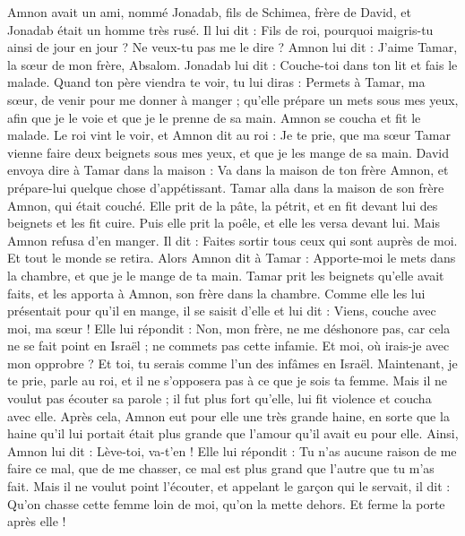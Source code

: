 \begin{multicols}{2}
Amnon avait un ami, nommé Jonadab, fils de Schimea, frère de David, et Jonadab était un homme très rusé.
Il lui dit : Fils de roi, pourquoi maigris-tu ainsi de jour en jour ? Ne veux-tu pas me le dire ? Amnon lui dit : J'aime Tamar, la sœur de mon frère, Absalom.
Jonadab lui dit : Couche-toi dans ton lit et fais le malade. Quand ton père viendra te voir, tu lui diras : Permets à Tamar, ma sœur, de venir pour me donner à manger ; qu'elle prépare un mets sous mes yeux, afin que je le voie et que je le prenne de sa main.
Amnon se coucha et fit le malade. Le roi vint le voir, et Amnon dit au roi : Je te prie, que ma sœur Tamar vienne faire deux beignets sous mes yeux, et que je les mange de sa main.
David envoya dire à Tamar dans la maison : Va dans la maison de ton frère Amnon, et prépare-lui quelque chose d'appétissant.
Tamar alla dans la maison de son frère Amnon, qui était couché. Elle prit de la pâte, la pétrit, et en fit devant lui des beignets et les fit cuire.
Puis elle prit la poêle, et elle les versa devant lui. Mais Amnon refusa d'en manger. Il dit : Faites sortir tous ceux qui sont auprès de moi. Et tout le monde se retira.
Alors Amnon dit à Tamar : Apporte-moi le mets dans la chambre, et que je le mange de ta main. Tamar prit les beignets qu'elle avait faits, et les apporta à Amnon, son frère dans la chambre.
Comme elle les lui présentait pour qu'il en mange, il se saisit d'elle et lui dit : Viens, couche avec moi, ma sœur !
Elle lui répondit : Non, mon frère, ne me déshonore pas, car cela ne se fait point en Israël ; ne commets pas cette infamie.
Et moi, où irais-je avec mon opprobre ? Et toi, tu serais comme l'un des infâmes en Israël. Maintenant, je te prie, parle au roi, et il ne s'opposera pas à ce que je sois ta femme.
Mais il ne voulut pas écouter sa parole ; il fut plus fort qu'elle, lui fit violence et coucha avec elle.
Après cela, Amnon eut pour elle une très grande haine, en sorte que la haine qu'il lui portait était plus grande que l'amour qu'il avait eu pour elle. Ainsi, Amnon lui dit : Lève-toi, va-t'en !
Elle lui répondit : Tu n'as aucune raison de me faire ce mal, que de me chasser, ce mal est plus grand que l'autre que tu m'as fait.
Mais il ne voulut point l'écouter, et appelant le garçon qui le servait, il dit : Qu'on chasse cette femme loin de moi, qu'on la mette dehors. Et ferme la porte après elle !

\end{multicols}
